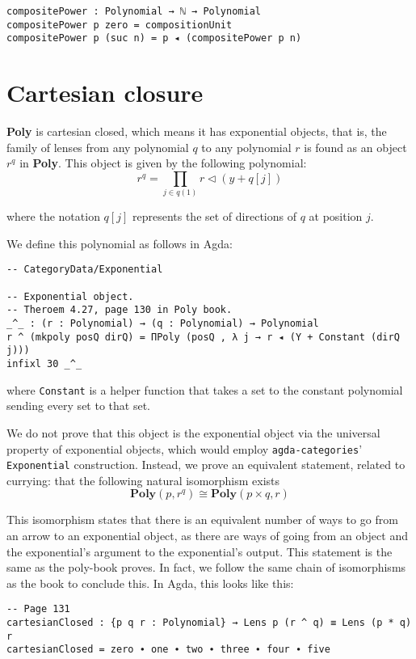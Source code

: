 \begin{verbatim}
compositePower : Polynomial → ℕ → Polynomial
compositePower p zero = compositionUnit
compositePower p (suc n) = p ◂ (compositePower p n) 
\end{verbatim}

\section{Cartesian closure}

\textbf{Poly} is cartesian closed, which means it has exponential objects, that is, the family of lenses from any polynomial $q$ to any polynomial $r$ is found as an object $r^q$ in \textbf{Poly}. This object is given by the following polynomial:
$$
\begin{equation}\label{eqn.exponential}
  r^q = \prod_{j\in q(1)}r\triangleleft(y+q[j])
\end{equation}
$$

where the notation $q[j]$ represents the set of directions of $q$ at position $j$.

We define this polynomial as follows in Agda:
\begin{verbatim}
-- CategoryData/Exponential

-- Exponential object.
-- Theroem 4.27, page 130 in Poly book.
_^_ : (r : Polynomial) → (q : Polynomial) → Polynomial
r ^ (mkpoly posQ dirQ) = ΠPoly (posQ , λ j → r ◂ (Y + Constant (dirQ j)))
infixl 30 _^_
\end{verbatim}
where \texttt{Constant} is a helper function that takes a set to the constant polynomial sending every set to that set.

We do not prove that this object is the exponential object via the universal property of exponential objects, which would employ \texttt{agda-categories}' \texttt{Exponential} construction. Instead, we prove an equivalent statement, related to currying: that the following natural isomorphism exists 
$$
\textbf{Poly}(p, r^q) \cong \textbf{Poly}(p \times q, r)
$$

This isomorphism states that there is an equivalent number of ways to go from an arrow to an exponential object, as there are ways of going from an object and the exponential's argument to the exponential's output. This statement is the same as the poly-book proves. In fact, we follow the same chain of isomorphisms as the book to conclude this. In Agda, this looks like this:
\begin{verbatim}
-- Page 131
cartesianClosed : {p q r : Polynomial} → Lens p (r ^ q) ≡ Lens (p * q) r
cartesianClosed = zero ∙ one ∙ two ∙ three ∙ four ∙ five
\end{verbatim}

